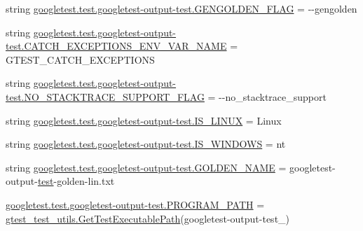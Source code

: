 \begin{DoxyCompactItemize}
\item 
string \mbox{\hyperlink{namespacegoogletest_1_1test_1_1googletest-output-test_ae8ed92d1b80670c2fef2d14e5752d3f2}{googletest.\+test.\+googletest-\/output-\/test.\+G\+E\+N\+G\+O\+L\+D\+E\+N\+\_\+\+F\+L\+AG}} = \textquotesingle{}-\/-\/gengolden\textquotesingle{}
\item 
string \mbox{\hyperlink{namespacegoogletest_1_1test_1_1googletest-output-test_a7cf3483092da91eb1d8212280dbebaf8}{googletest.\+test.\+googletest-\/output-\/test.\+C\+A\+T\+C\+H\+\_\+\+E\+X\+C\+E\+P\+T\+I\+O\+N\+S\+\_\+\+E\+N\+V\+\_\+\+V\+A\+R\+\_\+\+N\+A\+ME}} = \textquotesingle{}G\+T\+E\+S\+T\+\_\+\+C\+A\+T\+C\+H\+\_\+\+E\+X\+C\+E\+P\+T\+I\+O\+NS\textquotesingle{}
\item 
string \mbox{\hyperlink{namespacegoogletest_1_1test_1_1googletest-output-test_a6d6b31f6d4a75dc726bf1d7b21a1b89e}{googletest.\+test.\+googletest-\/output-\/test.\+N\+O\+\_\+\+S\+T\+A\+C\+K\+T\+R\+A\+C\+E\+\_\+\+S\+U\+P\+P\+O\+R\+T\+\_\+\+F\+L\+AG}} = \textquotesingle{}-\/-\/no\+\_\+stacktrace\+\_\+support\textquotesingle{}
\item 
string \mbox{\hyperlink{namespacegoogletest_1_1test_1_1googletest-output-test_a2270fb2b04b4046eef728638608b0ed1}{googletest.\+test.\+googletest-\/output-\/test.\+I\+S\+\_\+\+L\+I\+N\+UX}} = \textquotesingle{}Linux\textquotesingle{}
\item 
string \mbox{\hyperlink{namespacegoogletest_1_1test_1_1googletest-output-test_a427ad6a16b43c61d7733afb3571b0c78}{googletest.\+test.\+googletest-\/output-\/test.\+I\+S\+\_\+\+W\+I\+N\+D\+O\+WS}} = \textquotesingle{}nt\textquotesingle{}
\item 
string \mbox{\hyperlink{namespacegoogletest_1_1test_1_1googletest-output-test_a48529ecdda438cb5f92cdab8f181b6ab}{googletest.\+test.\+googletest-\/output-\/test.\+G\+O\+L\+D\+E\+N\+\_\+\+N\+A\+ME}} = \textquotesingle{}googletest-\/output-\/\mbox{\hyperlink{_mutual_8h_a707ee03719e99670bf6cfdfd897b8456}{test}}-\/golden-\/lin.\+txt\textquotesingle{}
\item 
\mbox{\hyperlink{namespacegoogletest_1_1test_1_1googletest-output-test_a467b9ea0b4c6224d494db6c2ca568d19}{googletest.\+test.\+googletest-\/output-\/test.\+P\+R\+O\+G\+R\+A\+M\+\_\+\+P\+A\+TH}} = \mbox{\hyperlink{namespacegtest__test__utils_a89ed3717984a80ffbb7a9c92f71b86a2}{gtest\+\_\+test\+\_\+utils.\+Get\+Test\+Executable\+Path}}(\textquotesingle{}googletest-\/output-\/test\+\_\+\textquotesingle{})
\item 

\end{DoxyCompactItemize}
